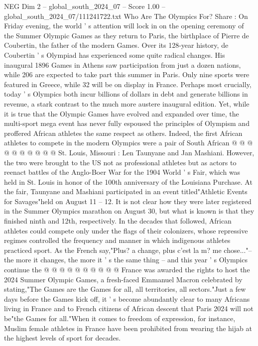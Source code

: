 \begin{textsample}{NEG Dim 2 – global\_south\_2024\_07 – Score 1.00 – global\_south\_2024\_07/111241722.txt}  \label{ex:f2_neg_283}
Who Are The Olympics For?
Share : On Friday evening, the world ' s attention will lock in on the opening ceremony of the Summer Olympic Games as they return to Paris, the birthplace of Pierre de Coubertin, the father of the modern Games.
Over its 128-year history, de Coubertin ' s Olympiad has experienced some quite radical changes.
His inaugural 1896 Games in Athens saw participation from just a dozen nations, while 206 are expected to take part this summer in Paris.
Only nine sports were featured in Greece, while 32 will be on display in France.
Perhaps most crucially, today ' s Olympics both incur billions of dollars in debt and generate billions in revenue, a stark contrast to the much more austere inaugural edition.
Yet, while it is true that the Olympic Games have evolved and expanded over time, the multi-sport mega event has never fully espoused the principles of Olympism and proffered African athletes the same respect as others.
Indeed, the first African athletes to compete in the modern Olympics were a pair of South African @ @ @ @ @ @ @ @ @ @ St.
Louis, Missouri : Len Taunyane and Jan Mashiani.
However, the two were brought to the US not as professional athletes but as actors to reenact battles of the Anglo-Boer War for the 1904 World ' s Fair, which was held in St.
Louis in honor of the 100th anniversary of the Louisiana Purchase.
At the fair, Taunyane and Mashiani participated in an event titled"Athletic Events for Savages"held on August 11 -- 12.
It is not clear how they were later registered in the Summer Olympics marathon on August 30, but what is known is that they finished ninth and 12th, respectively.
In the decades that followed, African athletes could compete only under the flags of their colonizers, whose repressive regimes controlled the frequency and manner in which indigenous athletes practiced sport.
As the French say,"Plus? a change, plus c'est la m? me chose..."-- the more it changes, the more it ' s the same thing -- and this year ' s Olympics continue the @ @ @ @ @ @ @ @ @ @ France was awarded the rights to host the 2024 Summer Olympic Games, a fresh-faced Emmanuel Macron celebrated by stating,"The Games are the Games for all, all territories, all sectors."Just a few days before the Games kick off, it ' s become abundantly clear to many Africans living in France and to French citizens of African descent that Paris 2024 will not be"the Games for all."When it comes to freedom of expression, for instance, Muslim female athletes in France have been prohibited from wearing the hijab at the highest levels of sport for decades.

\end{textsample}
